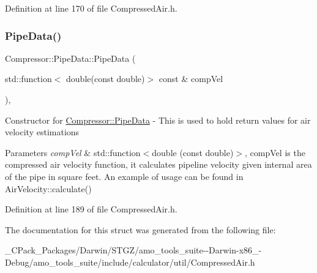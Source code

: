 Definition at line 170 of file Compressed\+Air.\+h.

\mbox{\label{struct_compressor_1_1_pipe_data_af7998fd533340b0a84e78fcda91b4806}} 
\subsubsection{\texorpdfstring{Pipe\+Data()}{PipeData()}\hspace{0.1cm}{\footnotesize\ttfamily [6/6]}}
{\footnotesize\ttfamily Compressor\+::\+Pipe\+Data\+::\+Pipe\+Data (\begin{DoxyParamCaption}\item[{std\+::function$<$ double(const double)$>$ const \&}]{comp\+Vel }\end{DoxyParamCaption})\hspace{0.3cm}{\ttfamily [inline]}, {\ttfamily [explicit]}}

Constructor for \hyperlink{struct_compressor_1_1_pipe_data}{Compressor\+::\+Pipe\+Data} -\/ This is used to hold return values for air velocity estimations 
\begin{DoxyParams}{Parameters}
{\em comp\+Vel} & std\+::function$<$double (const double)$>$, comp\+Vel is the compressed air velocity function, it calculates pipeline velocity given internal area of the pipe in square feet. An example of usage can be found in Air\+Velocity\+::calculate() \\
\hline
\end{DoxyParams}


Definition at line 189 of file Compressed\+Air.\+h.



The documentation for this struct was generated from the following file\+:\begin{DoxyCompactItemize}
\item 
\+\_\+\+C\+Pack\+\_\+\+Packages/\+Darwin/\+S\+T\+G\+Z/amo\+\_\+tools\+\_\+suite-\/-\/\+Darwin-\/x86\+\_-\/\+Debug/amo\+\_\+tools\+\_\+suite/include/calculator/util/Compressed\+Air.\+h\end{DoxyCompactItemize}
